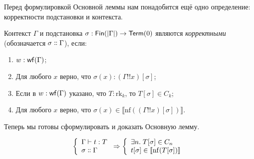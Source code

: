 Перед формулировкой Основной леммы нам понадобится ещё
одно определение: корректности подстановки и контекста.

\begin{definition}
    Контекст $\Gamma$ и подстановка
    $\sigma:\mathsf{Fin}(|\Gamma|)\to\mathsf{Term}(0)$ являются
    \emph{корректными} (обозначается
    $\sigma\dblcolon\Gamma$), если:
    \begin{enumerate}
        \item $w:\mathsf{wf}(\Gamma)$;
        \item Для любого $x$ верно, что
            $\sigma(x): (\Gamma\mathbin{!!}x)[\sigma]$;
        \item Если в $w:\mathsf{wf}(\Gamma)$ указано, что
            $T:\mathrm{rk}_k$, то $T[\sigma]\in C_k$;
        \item Для любого $x$ верно, что
            $\sigma(x)\in\llbracket\mathrm{nf}(
            (\Gamma\mathbin{!!}x)[\sigma])\rrbracket$.
    \end{enumerate}
\end{definition}

Теперь мы готовы сформулировать и доказать Основную
лемму.

\begin{lemma}
\[
    \left\{\begin{array}{l}
        \Gamma\vdash t:T \\
        \sigma\dblcolon\Gamma
    \end{array}\right.\Rightarrow
    \left\{\begin{array}{l}
        \exists n.\; T[\sigma] \in C_n \\
        t[\sigma] \in
            \llbracket\mathrm{nf}(T[\sigma])\rrbracket
    \end{array}\right.
\]
\end{lemma}


